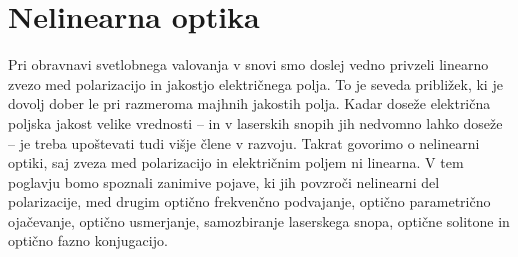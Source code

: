 
\chapter{Nelinearna optika}
\label{chap:NLO}
Pri obravnavi svetlobnega valovanja v snovi smo doslej vedno privzeli linearno 
zvezo med polarizacijo in jakostjo električnega polja. To 
je seveda približek, ki je dovolj dober le pri razmeroma majhnih jakostih
polja. Kadar doseže električna poljska jakost velike vrednosti -- in v laserskih snopih
jih nedvomno lahko doseže -- je treba upoštevati tudi višje člene v razvoju. Takrat
govorimo o nelinearni optiki, saj zveza med polarizacijo
in električnim poljem ni linearna. V tem poglavju bomo spoznali zanimive pojave, ki jih 
povzroči nelinearni del polarizacije, med drugim optično 
frekvenčno podvajanje, optično parametrično ojačevanje, optično usmerjanje, 
samozbiranje laserskega snopa, optične solitone in optično fazno konjugacijo. 

